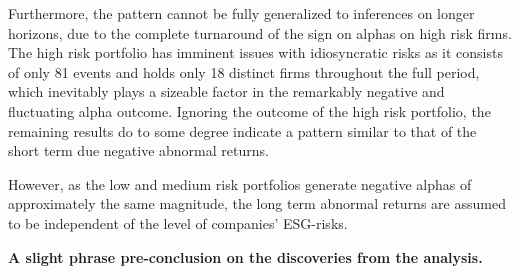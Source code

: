 Furthermore, the pattern cannot be fully generalized to inferences on longer horizons, due to the complete turnaround of the sign on alphas on high risk firms. The high risk portfolio has imminent issues with idiosyncratic risks as it consists of only 81 events and holds only 18 distinct firms throughout the full period, which inevitably plays a sizeable factor in the remarkably negative and fluctuating alpha outcome. Ignoring the outcome of the high risk portfolio, the remaining results do to some degree indicate a pattern similar to that of the short term due negative abnormal returns.

However, as the low and medium risk portfolios generate negative alphas of approximately the same magnitude, the long term abnormal returns are assumed to be independent of the level of companies' ESG-risks. 


\textbf{A slight phrase pre-conclusion on the discoveries from the analysis.}